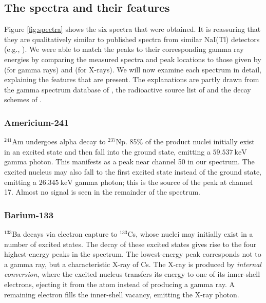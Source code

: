 \documentclass[twocol]{ametsocV6.1}
\begin{document}
\subsection{The spectra and their features}
Figure \ref{fig:spectra} shows the six spectra that were obtained. It
is reassuring that they are qualitatively similar to published spectra
from similar NaI(Tl) detectors (e.g., \cite{gammaspectacular}).
We were able to match the peaks to their corresponding gamma ray energies
by comparing the measured spectra and peak locations to those given by
\cite{heath} (for gamma rays) and \cite{shirley_1978} (for X-rays).
We will now examine each spectrum in detail, explaining the features
that are present. The explanations are partly drawn from the gamma spectrum
database of \cite{gammaspectacular}, the radioactive source list of
\cite{ld_didactic} and the decay schemes of \cite{shirley_1978}.

\subsubsection{Americium-241}
$^{241}$Am undergoes alpha decay to $^{237}$Np. 85\% of the product
nuclei initially exist in an excited state and then fall into the
ground state, emitting a $\SI{59.537}{\kilo\electronvolt}$ gamma photon.
This manifests as a peak near channel 50 in our spectrum. The excited nucleus
may also fall to the first excited state instead of the ground state,
emitting a $\SI{26.345}{\kilo\electronvolt}$ gamma photon; this is the source
of the peak at channel 17. Almost no signal is seen in the remainder of the
spectrum.

\subsubsection{Barium-133}
$^{133}$Ba decays via electron capture to $^{133}$Cs, whose nuclei may
initially exist in a number of excited states. The decay of these excited
states gives rise to the four highest-energy peaks in the spectrum. The
lowest-energy peak corresponds not to a gamma ray, but a characteristic
X-ray of Cs. The X-ray is produced by \emph{internal conversion}, where
the excited nucleus transfers its energy to one of its inner-shell electrons,
ejecting it from the atom instead of producing a gamma ray. A remaining
electron fills the inner-shell vacancy, emitting the X-ray photon.
\end{document}
